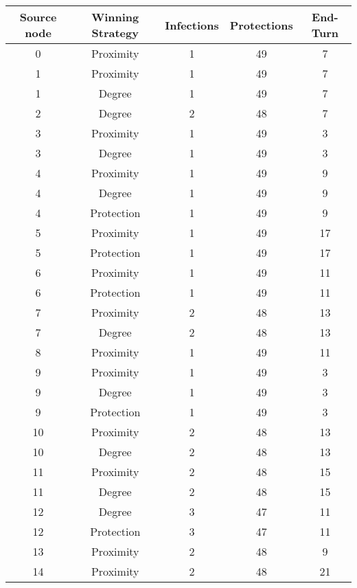 \documentclass[results.tex]{subfiles}
\begin{document}
\begin{center}
  \begin{tabular}{| c || c | c | c | c |}
    \hline
    {\bfseries Source node} & {\bfseries Winning Strategy} & {\bfseries Infections} & {\bfseries Protections} & {\bfseries End-Turn} \\  %
    \hline\hline
    0 & Proximity & 1 & 49 & 7 \\ 
    \hline
    1 & Proximity & 1 & 49 & 7 \\ 
    \hline
    1 & Degree & 1 & 49 & 7 \\ 
    \hline
    2 & Degree & 2 & 48 & 7 \\ 
    \hline
    3 & Proximity & 1 & 49 & 3 \\ 
    \hline
    3 & Degree & 1 & 49 & 3 \\ 
    \hline
    4 & Proximity & 1 & 49 & 9 \\ 
    \hline
    4 & Degree & 1 & 49 & 9 \\ 
    \hline
    4 & Protection & 1 & 49 & 9 \\ 
    \hline
    5 & Proximity & 1 & 49 & 17 \\ 
    \hline
    5 & Protection & 1 & 49 & 17 \\ 
    \hline
    6 & Proximity & 1 & 49 & 11 \\ 
    \hline
    6 & Protection & 1 & 49 & 11 \\ 
    \hline
    7 & Proximity & 2 & 48 & 13 \\ 
    \hline
    7 & Degree & 2 & 48 & 13 \\ 
    \hline
    8 & Proximity & 1 & 49 & 11 \\ 
    \hline
    9 & Proximity & 1 & 49 & 3 \\ 
    \hline
    9 & Degree & 1 & 49 & 3 \\ 
    \hline
    9 & Protection & 1 & 49 & 3 \\ 
    \hline
    10 & Proximity & 2 & 48 & 13 \\ 
    \hline
    10 & Degree & 2 & 48 & 13 \\ 
    \hline
    11 & Proximity & 2 & 48 & 15 \\ 
    \hline
    11 & Degree & 2 & 48 & 15 \\ 
    \hline
    12 & Degree & 3 & 47 & 11 \\ 
    \hline
    12 & Protection & 3 & 47 & 11 \\ 
    \hline
    13 & Proximity & 2 & 48 & 9 \\ 
    \hline
    14 & Proximity & 2 & 48 & 21 \\ 

\end{tabular}
\end{center}
\end{document}
